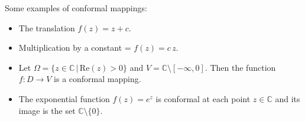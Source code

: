 \documentclass{amsart}
\begin{document}
Some examples of conformal mappings:
\begin{itemize}
\item The translation \(f(z) = z + c\).
\item Multiplication by a constant = \(f(z) = c\,z\).
\item Let \(\Omega = \{ z \in \mathbb{C} \, | \, \mbox{Re}(z) > 0\}\) and \(V = \mathbb{C}\setminus [-\infty, 0]\). Then the function \(f: D \to V\) is a conformal mapping.
\item The exponential function \(f(z) = e^{z}\) is conformal at each point \(z\in\mathbb{C}\) and its image is the set \(\mathbb{C}\setminus\{0\}\).
\end{itemize}
\end{document}
